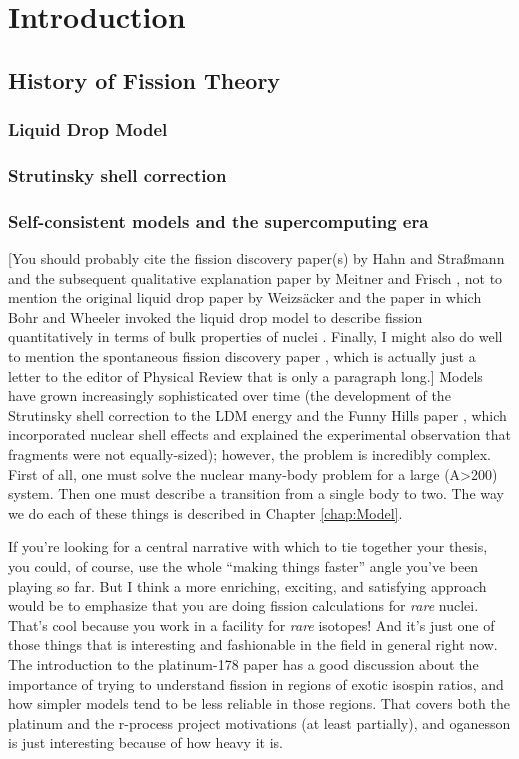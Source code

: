 \chapter{Introduction}\label{chap:Intro}

\section{History of Fission Theory}
\subsection{Liquid Drop Model}
\subsection{Strutinsky shell correction}
\subsection{Self-consistent models and the supercomputing era}
[You should probably cite the fission discovery paper(s) by Hahn and Stra\ss{}mann \cite{Hahn1939} and the subsequent qualitative explanation paper by Meitner and Frisch \cite{Meitner1939}, not to mention the original liquid drop paper by Weizs\"acker \cite{Weizsacker1935} and the paper in which Bohr and Wheeler invoked the liquid drop model to describe fission quantitatively in terms of bulk properties of nuclei \cite{Bohr1939}. Finally, I might also do well to mention the spontaneous fission discovery paper \cite{Flerov1940}, which is actually just a letter to the editor of Physical Review that is only a paragraph long.] Models have grown increasingly sophisticated over time (the development of the Strutinsky shell correction to the LDM energy and the Funny Hills paper \cite{Strutinsky1967,Strutinsky1968,Brack1972}, which incorporated nuclear shell effects and explained the experimental observation that fragments were not equally-sized); however, the problem is incredibly complex. First of all, one must solve the nuclear many-body problem for a large (A>200) system. Then one must describe a transition from a single body to two. The way we do each of these things is described in Chapter \ref{chap:Model}.

If you're looking for a central narrative with which to tie together your thesis, you could, of course, use the whole ``making things faster'' angle you've been playing so far. But I think a more enriching, exciting, and satisfying approach would be to emphasize that you are doing fission calculations for \textit{rare} nuclei. That's cool because you work in a facility for \textit{rare} isotopes! And it's just one of those things that is interesting and fashionable in the field in general right now. The introduction to the platinum-178 paper has a good discussion about the importance of trying to understand fission in regions of exotic isospin ratios, and how simpler models tend to be less reliable in those regions. That covers both the platinum and the r-process project motivations (at least partially), and oganesson is just interesting because of how heavy it is.

